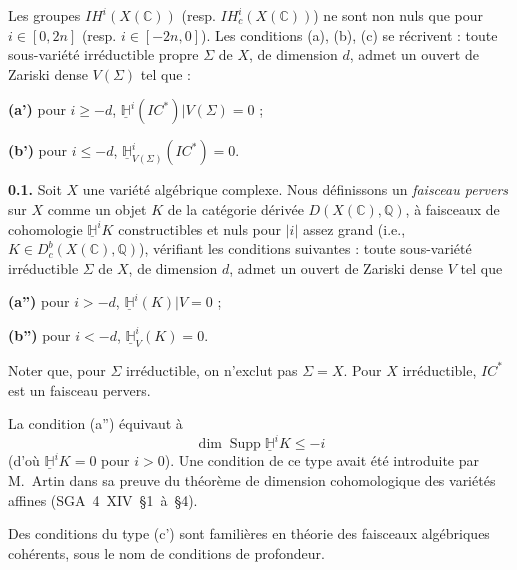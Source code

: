 \documentclass[12pt,a4paper]{article}
\theoremstyle{plain}
\theoremstyle{definition}
\theoremstyle{remark}
\DeclareMathOperator{\Supp}{Supp}
\DeclareMathOperator{\pdim}{dim}
\newcommand{\IH}{\mathit{IH}}
\newcommand{\HH}{\mathbb{H}}
\newcommand{\IC}{\mathit{IC}}
\newcommand{\CC}{\mathbb{C}}
\newcommand{\QQ}{\mathbb{Q}}
\begin{document}
Les groupes $\IH^{i}(X(\CC))$ (resp. $\IH^{i}_{c}(X(\CC))$) ne sont non nuls que pour $i \in [0, 2n]$ (resp. $i \in [-2n, 0]$). Les conditions (a), (b), (c) se récrivent : toute sous-variété irréductible propre $\Sigma$ de $X$, de dimension $d$, admet un ouvert de Zariski dense $V(\Sigma)$ tel que :

\medskip

\noindent
\textbf{(a')} pour $i \geq -d$, $\underline{\HH}^{i}(\IC^{*})|V(\Sigma) = 0$ ;

\smallskip

\noindent
\textbf{(b')} pour $i \leq -d$, $\underline{\HH}^{i}_{V(\Sigma)}(\IC^{*}) = 0$.

\medskip

\noindent
\textbf{0.1.} Soit $X$ une variété algébrique complexe. Nous définissons un \emph{faisceau pervers} sur $X$ comme un objet $K$ de la catégorie dérivée $D(X(\CC), \QQ)$, à faisceaux de cohomologie $\underline{\HH}^{i}K$ constructibles et nuls pour $|i|$ assez grand (i.e., $K \in D^{b}_{c}(X(\CC), \QQ)$), vérifiant les conditions suivantes : toute sous-variété irréductible $\Sigma$ de $X$, de dimension $d$, admet un ouvert de Zariski dense $V$ tel que

\medskip

\noindent
\textbf{(a'')} pour $i > -d$, $\underline{\HH}^{i}(K)|V = 0$ ;

\smallskip

\noindent
\textbf{(b'')} pour $i < -d$, $\underline{\HH}^{i}_{V}(K) = 0$.

\medskip

Noter que, pour $\Sigma$ irréductible, on n'exclut pas $\Sigma = X$. Pour $X$ irréductible, $\IC^{*}$ est un faisceau pervers.

La condition (a'') équivaut à
\[
\pdim \Supp \underline{\HH}^{i}K \leq -i
\]
(d'où $\underline{\HH}^{i}K = 0$ pour $i > 0$). Une condition de ce type avait été introduite par M.~Artin dans sa preuve du théorème de dimension cohomologique des variétés affines (SGA~4~XIV~§1~à~§4).

\medskip

Des conditions du type (c') sont familières en théorie des faisceaux algébriques cohérents, sous le nom de conditions de profondeur.

\medskip
\end{document}
